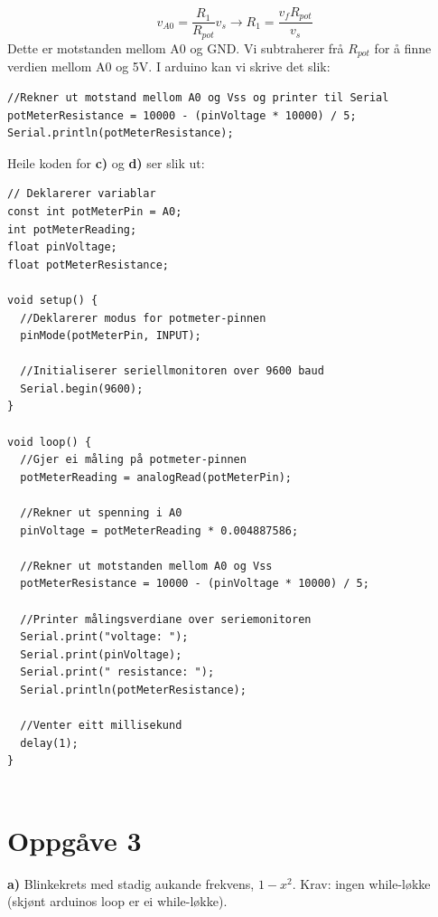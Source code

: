 \documentclass[12pt,a4paper]{article}
\begin{document}
  \begin{equation}
    v_{A0} = \frac{R_1}{R_{pot}}v_s \rightarrow R_1 = \frac{v_f R_{pot}}{v_s}
  \end{equation}
  Dette er motstanden mellom A0 og GND. Vi subtraherer frå $R_{pot}$ for å finne
  verdien mellom A0 og 5V. I arduino kan vi skrive det slik:

  \begin{lstlisting}[language=Arduino, basicstyle=\small]
//Rekner ut motstand mellom A0 og Vss og printer til Serial
potMeterResistance = 10000 - (pinVoltage * 10000) / 5;
Serial.println(potMeterResistance);
  \end{lstlisting}

  \newpage

  Heile koden for \textbf{c)} og \textbf{d)} ser slik ut:
  \begin{lstlisting}[language=Arduino, basicstyle=\small]
// Deklarerer variablar
const int potMeterPin = A0;
int potMeterReading;
float pinVoltage;
float potMeterResistance;

void setup() {
  //Deklarerer modus for potmeter-pinnen
  pinMode(potMeterPin, INPUT);

  //Initialiserer seriellmonitoren over 9600 baud
  Serial.begin(9600);
}

void loop() {
  //Gjer ei måling på potmeter-pinnen
  potMeterReading = analogRead(potMeterPin);

  //Rekner ut spenning i A0
  pinVoltage = potMeterReading * 0.004887586;

  //Rekner ut motstanden mellom A0 og Vss
  potMeterResistance = 10000 - (pinVoltage * 10000) / 5;
  
  //Printer målingsverdiane over seriemonitoren
  Serial.print("voltage: ");
  Serial.print(pinVoltage);
  Serial.print(" resistance: ");
  Serial.println(potMeterResistance);

  //Venter eitt millisekund
  delay(1);
}


  \end{lstlisting}

  \newpage

  \section{Oppgåve 3}
  \textbf{a)} Blinkekrets med stadig aukande frekvens, $1 - x^2$. Krav: ingen
  while-løkke (skjønt arduinos loop er ei while-løkke).
\end{document}
